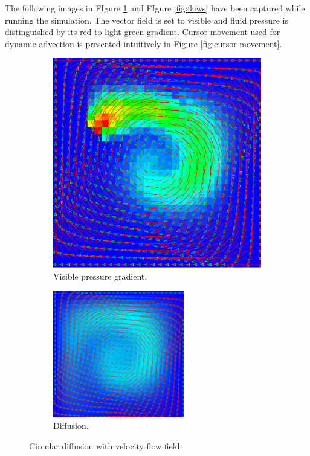 \documentclass[12pt, titlepage]{article}
\begin{document}
The following images in FIgure \ref{fig:circular} and FIgure \ref{fig:flows} have been captured while running the simulation. The vector field is set to visible and fluid pressure is distinguished by its red to light green gradient. Cursor movement used for dynamic advection is presented intuitively in Figure \ref{fig:cursor-movement}.

\begin{figure}[h!]
  \centering
  \begin{subfigure}[b]{0.4\linewidth}
    \includegraphics[width=\linewidth]{images/sim2.png}
    \caption{Visible pressure gradient.}
  \end{subfigure}
  \begin{subfigure}[b]{0.4\linewidth}
    \includegraphics[width=\linewidth, height=55.3mm]{images/sim1.png}
    \caption{Diffusion.}
  \end{subfigure}
  \caption{Circular diffusion with velocity flow field.}
  \label{fig:circular}
\end{figure}
\end{document}
